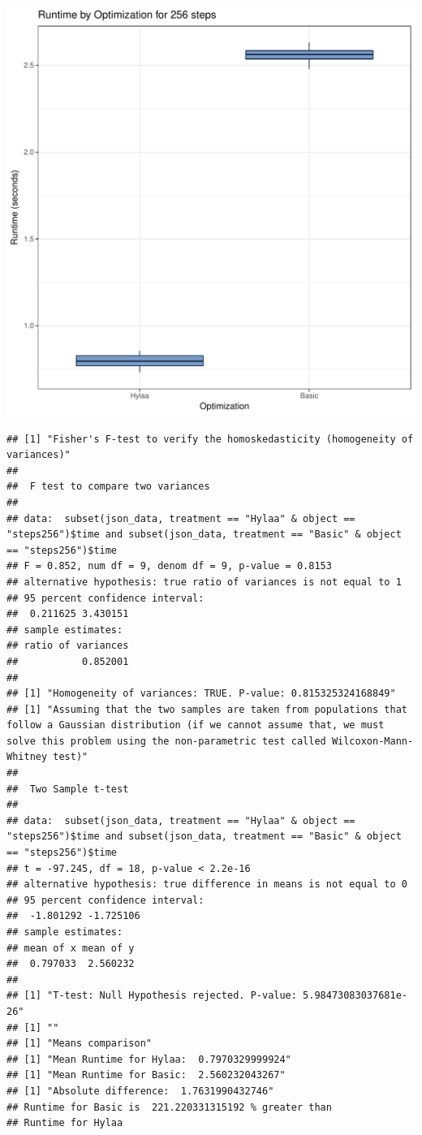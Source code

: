 \documentclass{article}\usepackage[]{graphicx}\usepackage[]{color}
\makeatletter
\def\maxwidth{ %
  \ifdim\Gin@nat@width>\linewidth
    \linewidth
  \else
    \Gin@nat@width
  \fi
}
\newenvironment{kframe}{%
 \def\at@end@of@kframe{}%
 \ifinner\ifhmode%
  \def\at@end@of@kframe{\end{minipage}}%
  \begin{minipage}{\columnwidth}%
 \fi\fi%
 \def\FrameCommand##1{\hskip\@totalleftmargin \hskip-\fboxsep
 \colorbox{shadecolor}{##1}\hskip-\fboxsep
     \hskip-\linewidth \hskip-\@totalleftmargin \hskip\columnwidth}%
 \MakeFramed {\advance\hsize-\width
   \@totalleftmargin\z@ \linewidth\hsize
   \@setminipage}}%
 {\par\unskip\endMakeFramed%
 \at@end@of@kframe}
\newenvironment{knitrout}{}{} %
\makeatother
\begin{document}
\begin{knitrout}
\color{fgcolor}
\includegraphics[width=\maxwidth]{figure/RH3_steps256-1} 
\begin{kframe}\begin{verbatim}
## [1] "Fisher's F-test to verify the homoskedasticity (homogeneity of variances)"
## 
## 	F test to compare two variances
## 
## data:  subset(json_data, treatment == "Hylaa" & object == "steps256")$time and subset(json_data, treatment == "Basic" & object == "steps256")$time
## F = 0.852, num df = 9, denom df = 9, p-value = 0.8153
## alternative hypothesis: true ratio of variances is not equal to 1
## 95 percent confidence interval:
##  0.211625 3.430151
## sample estimates:
## ratio of variances 
##           0.852001 
## 
## [1] "Homogeneity of variances: TRUE. P-value: 0.815325324168849"
## [1] "Assuming that the two samples are taken from populations that follow a Gaussian distribution (if we cannot assume that, we must solve this problem using the non-parametric test called Wilcoxon-Mann-Whitney test)"
## 
## 	Two Sample t-test
## 
## data:  subset(json_data, treatment == "Hylaa" & object == "steps256")$time and subset(json_data, treatment == "Basic" & object == "steps256")$time
## t = -97.245, df = 18, p-value < 2.2e-16
## alternative hypothesis: true difference in means is not equal to 0
## 95 percent confidence interval:
##  -1.801292 -1.725106
## sample estimates:
## mean of x mean of y 
##  0.797033  2.560232 
## 
## [1] "T-test: Null Hypothesis rejected. P-value: 5.98473083037681e-26"
## [1] ""
## [1] "Means comparison"
## [1] "Mean Runtime for Hylaa:  0.7970329999924"
## [1] "Mean Runtime for Basic:  2.560232043267"
## [1] "Absolute difference:  1.7631990432746"
## Runtime for Basic is  221.220331315192 % greater than 
## Runtime for Hylaa
\end{verbatim}
\end{kframe}
\end{knitrout}
\end{document}
